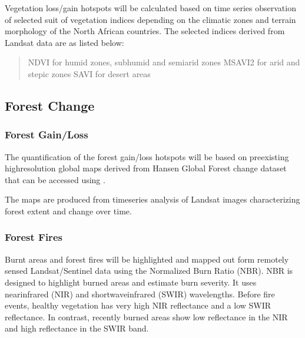 \documentclass[letterpaper,10pt,english]{sphinxmanual}
\begin{document}
\sphinxAtStartPar
Vegetation loss/gain hotspots will be calculated based on time series observation of selected suit of vegetation indices depending on the climatic zones and terrain morphology of the North African countries. The selected indices derived from Landsat data are as listed below:
\begin{quote}

\sphinxAtStartPar
\sphinxhyphen{}NDVI for humid zones, sub\sphinxhyphen{}humid and semi\sphinxhyphen{}arid zones
\sphinxhyphen{}MSAVI2 for arid and stepic zones
\sphinxhyphen{}SAVI for desert areas
\end{quote}


\subsection{Forest Change}
\label{\detokenize{Background/LD_indicators:forest-change}}

\subsubsection{Forest Gain/Loss}
\label{\detokenize{Background/LD_indicators:forest-gain-loss}}
\sphinxAtStartPar
The quantification of the forest gain/loss hotspots will be based on pre\sphinxhyphen{}existing high\sphinxhyphen{}resolution global maps derived from Hansen Global Forest change dataset that can be accessed using .
\begin{quote}
\end{quote}

\sphinxAtStartPar
The maps are produced from time\sphinxhyphen{}series analysis of Landsat images characterizing forest extent and change over time.


\subsubsection{Forest Fires}
\label{\detokenize{Background/LD_indicators:forest-fires}}
\sphinxAtStartPar
Burnt areas and forest fires will be highlighted and mapped out form remotely sensed Landsat/Sentinel data using the Normalized Burn Ratio (NBR). NBR is designed to highlight burned areas and estimate burn severity. It uses near\sphinxhyphen{}infrared (NIR) and shortwave\sphinxhyphen{}infrared (SWIR) wavelengths. Before fire events, healthy vegetation has very high NIR reflectance and a low SWIR reflectance. In contrast, recently burned areas show low reflectance in the NIR and high reflectance in the SWIR band.
\end{document}
